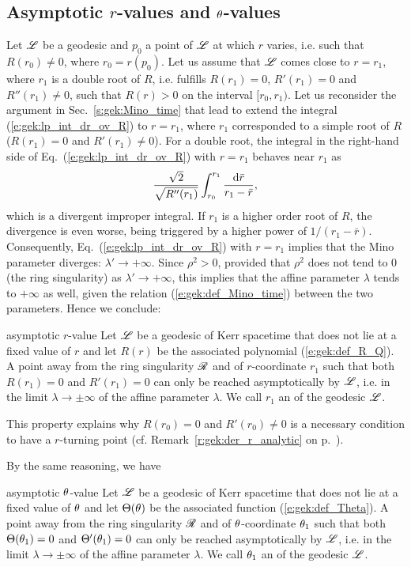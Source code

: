 \subsection{Asymptotic \texorpdfstring{$r$-values}{r-values} and \texorpdfstring{$\theta$-values}{θ-values}} \label{s:gek:asymptotic_values}

Let $\mathscr{L}$ be a geodesic
and $p_0$ a point of $\mathscr{L}$ at which $r$ varies,
i.e. such that $R(r_0) \neq 0$, where $r_0 = r(p_0)$.
Let us assume that $\mathscr{L}$ comes close to $r=r_1$, where
$r_1$ is a double root of $R$, i.e. fulfills $R(r_1)=0$, $R'(r_1)=0$ and
$R''(r_1)\neq 0$, such that $R(r) > 0$ on the interval $[r_0, r_1)$.
Let us reconsider the argument in Sec.~\ref{s:gek:Mino_time}
that lead to extend the integral
(\ref{e:gek:lp_int_dr_ov_R}) to $r=r_1$, where $r_1$ corresponded to
a simple root of $R$ ($R(r_1)=0$ and $R'(r_1)\neq 0$).
For a double root,
the integral in the right-hand side of Eq.~(\ref{e:gek:lp_int_dr_ov_R}) with $r=r_1$ behaves
near $r_1$ as
\[
    \frac{\sqrt{2}}{\sqrt{R''(r_1)}} \int_{r_0}^{r_1} \frac{\mathrm{d} \bar{r}}{r_1 - \bar{r}} ,
\]
which is a divergent improper integral. If $r_1$ is a higher order root of $R$,
the divergence is even worse, being triggered by a higher power of $1/(r_1 - \bar{r})$.
Consequently, Eq.~(\ref{e:gek:lp_int_dr_ov_R}) with $r=r_1$
implies that the Mino parameter diverges: $\lambda'\to +\infty$. Since $\rho^2 > 0$,
provided that $\rho^2$
does not tend to $0$ (the ring singularity) as $\lambda'\to +\infty$, this
implies that the affine parameter $\lambda$ tends to $+\infty$ as well, given
the relation (\ref{e:gek:def_Mino_time}) between the two parameters.
Hence we conclude:
\begin{tprop}{asymptotic $r$-value}{}
Let $\mathscr{L}$ be a geodesic of Kerr spacetime that does not lie at a fixed value of $r$
and let $R(r)$ be the associated polynomial
(\ref{e:gek:def_R_Q}).
A point away from the ring singularity $\mathscr{R}$ and of $r$-coordinate $r_1$
such that both $R(r_1) = 0$ and $R'(r_1) = 0$
can only be reached asymptotically by $\mathscr{L}$, i.e. in the limit
$\lambda\to \pm\infty$ of the affine parameter
$\lambda$. We call $r_1$ an  of the geodesic $\mathscr{L}$.
\end{tprop}
This property explains why $R(r_0) = 0$ and $R'(r_0) \neq 0$ is a necessary condition
to have a $r$-turning point (cf. Remark~\ref{r:gek:der_r_analytic} on p.~\pageref{r:gek:der_r_analytic}).

By the same reasoning, we have
\begin{tprop}{asymptotic $\theta$-value}{}
Let $\mathscr{L}$ be a geodesic of Kerr spacetime that does not lie at a fixed value of $\theta$ and let
$\Theta(\theta)$ be the associated function
(\ref{e:gek:def_Theta}).
A point away from the ring singularity $\mathscr{R}$ and of $\theta$-coordinate $\theta_1$
such that both $\Theta(\theta_1) = 0$ and $\Theta'(\theta_1) = 0$
can only be reached asymptotically by $\mathscr{L}$, i.e. in the limit
$\lambda\to \pm\infty$ of the affine parameter
$\lambda$. We call $\theta_1$ an
 of the geodesic $\mathscr{L}$.
\end{tprop}



